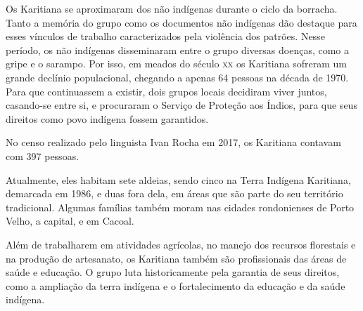 Os Karitiana se aproximaram dos não indígenas durante o ciclo da
borracha. Tanto a memória do grupo como os documentos não indígenas dão
destaque para esses vínculos de trabalho caracterizados pela violência
dos patrões. Nesse período, os não indígenas disseminaram entre o grupo
diversas doenças, como a gripe e o sarampo. Por isso, em meados do
século \textsc{xx} os Karitiana sofreram um grande declínio populacional,
chegando a apenas 64 pessoas na década de 1970. Para que continuassem a
existir, dois grupos locais decidiram viver juntos, casando-se entre si,
e procuraram o Serviço de Proteção aos Índios, para que seus direitos
como povo indígena fossem garantidos.

No censo realizado pelo linguista Ivan Rocha em 2017, os Karitiana
contavam com 397 pessoas.

Atualmente, eles habitam sete aldeias, sendo cinco na Terra Indígena
Karitiana, demarcada em 1986, e duas fora dela, em áreas que são parte
do seu território tradicional. Algumas famílias também moram nas cidades
rondonienses de Porto Velho, a capital, e em Cacoal.

Além de trabalharem em atividades agrícolas, no manejo dos recursos
florestais e na produção de artesanato, os Karitiana também são
profissionais das áreas de saúde e educação. O grupo luta historicamente
pela garantia de seus direitos, como a ampliação da terra indígena e o
fortalecimento da educação e da saúde indígena.



